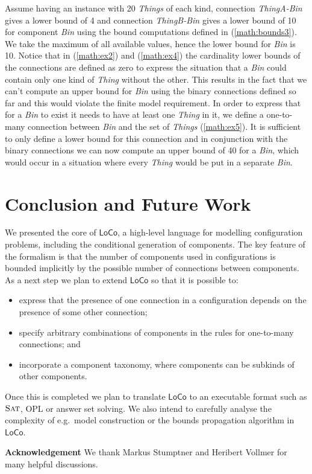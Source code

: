 \documentclass[copyright,creativecommons]{eptcs}
\newcommand{\SAT}{\ensuremath{\text{\sc Sat}}\xspace}
\newcommand{\LoCo}{\ensuremath{\mathsf{LoCo}}\xspace}
\begin{document}
Assume having an instance with 20 \textit{Things} of each kind, connection \textit{ThingA-Bin} gives a lower bound of 4 and connection \textit{ThingB-Bin} gives a lower bound of 10 for component \textit{Bin} using the bound computations defined in (\ref{math:bounds3}). We take the maximum of all available values, hence the lower bound for \textit{Bin} is 10. 
Notice that in (\ref{math:ex2}) and (\ref{math:ex4}) the cardinality lower bounds of the connections are defined as zero to express the situation that a \textit{Bin} could contain only one kind of \textit{Thing} without the other. 
This results in the fact that we can't compute an upper bound for \textit{Bin} using the binary connections defined so far and this would violate the finite model requirement. 
In order to express that for a \textit{Bin} to exist it needs to have at least one \textit{Thing} in it, we define a one-to-many connection between \textit{Bin} and the set of \textit{Things} (\ref{math:ex5}). It is sufficient to only define a lower bound for this connection and in conjunction with the binary connections we can now compute an upper bound of 40 for a \textit{Bin}, which would occur in a situation where every 
\textit{Thing} would be put in a separate \textit{Bin}. 

\section{Conclusion and Future Work}

We presented the core of \LoCo, a high-level language for modelling configuration problems, including the conditional generation of components. 
The key feature of the formalism is that the number of components used in configurations is bounded implicitly by the possible number of connections between components.
As a next step we plan to extend \LoCo so that it is possible to\/:

\begin{itemize}
\item express that the presence of one connection in a configuration depends on the presence of some other connection;
\item specify arbitrary combinations of components in the rules for one-to-many connections; and
\item incorporate a component taxonomy, where components can be subkinds of other components.
\end{itemize}

Once this is completed we plan to translate \LoCo to an executable format such as \SAT, OPL or answer set solving.
We also intend to carefully analyse the complexity of e.g.\ model construction or the bounds propagation algorithm in \LoCo.

{\noindent \bf Acknowledgement} We thank Markus Stumptner and Heribert Vollmer for many helpful discussions.



\end{document}
